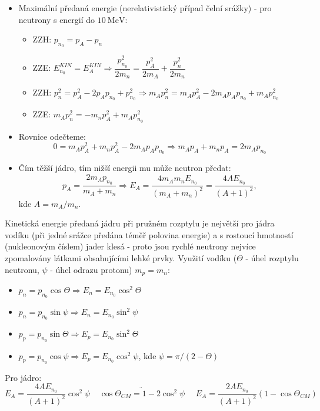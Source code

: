 \documentclass[../../main.tex]{subfiles}
\begin{document}
\begin{itemize}
	\item Maximální předaná energie (nerelativistický případ čelní srážky) - pro neutrony s energií do $10 ~\mathrm{MeV}$:
	\begin{itemize}
		\item ZZH: $p_{n_0} = p_A - p_n$
		\item ZZE: $E_{n_0}^{KIN} = E_{A}^{KIN} \Rightarrow \dfrac{p_{n_0}^{2}}{2 m_n} = \dfrac{p_{A}^{2}}{2 m_A} + \dfrac{p_{n}^{2}}{2 m_n}$
		\item ZZH: $p_{n}^{2} = p_{A}^{2} - 2 p_A p_{n_0} + p_{n_0}^2 \Rightarrow m_A p_{n}^2 = m_A p_{A}^2 - 2 m_A p_A p_{n_0} + m_A p_{n_0}^2$
		\item ZZE: $m_A p_{n}^2 = - m_n p_{A}^2 + m_A p_{n_0}^2$
	\end{itemize}	
	\item Rovnice odečteme:
	\begin{equation}
	0 = m_A p_{A}^2 + m_n p_{A}^2 - 2 m_A p_A p_{n_0} \Rightarrow m_A p_A + m_n p_A = 2 m_A p_{n_0}
	\end{equation}
	\item Čím těžší jádro, tím nižší energii mu může neutron předat:
	\begin{equation}
	p_A = \dfrac{2 m_A p_{n_0}}{m_A + m_n}  \Rightarrow E_A = \dfrac{4 m_A m_n E_{n_0}}{(m_A + m_n)^2} = \dfrac{4A E_{n_0}}{(A+1)^2},
	\end{equation}
	kde $A = m_A /m_n$.
\end{itemize}
Kinetická energie předaná jádru při pružném rozptylu je největší pro jádra vodíku (při jedné srážce předána téměř polovina energie) a s rostoucí hmotností (nukleonovým číslem) jader klesá - proto jsou rychlé neutrony nejvíce zpomalovány látkami obsahujícími lehké prvky. Využití vodíku ($\varTheta$ - úhel rozptylu neutronu, $\psi$ - úhel odrazu protonu) $m_p = m_n$:
\begin{itemize}
	\item $p_n = p_{n_0} \cos \varTheta \Rightarrow E_n = E_{n_0} \cos ^2 \varTheta$
	\item $p_n = p_{n_0} \sin \psi \Rightarrow E_n = E_{n_0} \sin ^2 \psi$
	\item $p_p = p_{n_0} \sin \varTheta \Rightarrow E_p = E_{n_0} \sin ^2 \varTheta$
	\item $p_p = p_{n_0} \cos \psi \Rightarrow E_p = E_{n_0} \cos ^2 \psi$,
	kde $\psi = \pi / (2 - \varTheta)$
\end{itemize}
Pro jádro:
\begin{equation}
E _A = \dfrac{4A E_{n_0}}{(A+1)^2} \cos^2 \psi ~~~~~ \underrightarrow{\cos \varTheta _{CM} = 1 - 2 \cos^2 \psi} ~~~~~~ E_A = \dfrac{2A E_{n_0}}{(A+1)^2} (1 - \cos \varTheta _{CM})
\end{equation}
\end{document}
